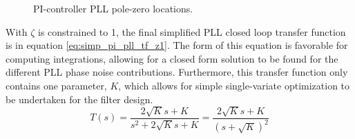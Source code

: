 			\begin{figure}[htb!]
				\center
				\caption{PI-controller PLL pole-zero locations.}
				\label{fig:pi_pll_pz}
			\end{figure}
			\FloatBarrier
			With $\zeta$ is constrained to 1, the final simplified PLL closed loop transfer function is in equation \ref{eq:simp_pi_pll_tf_z1}. The form of this equation is favorable for computing integrations, allowing for a closed form solution to be found for the different PLL phase noise contributions. Furthermore, this transfer function only contains one parameter, $K$, which allows for simple single-variate optimization to be undertaken for the filter design.
			\begin{equation} \label{eq:simp_pi_pll_tf_z1}
				T(s) = \frac{2\sqrt{K}s + K }{s^2 + 2\sqrt{K}s + K} = \frac{2\sqrt{K}s + K }{(s + \sqrt{K})^2}
			\end{equation}
			



